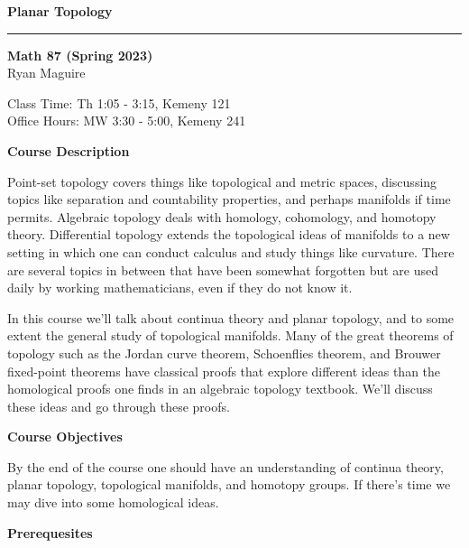 \documentclass{article}
\begin{document}
    \LARGE
    \textbf{Planar Topology}
    \hrule\par\hfill\par
    \normalsize
    \textbf{Math 87 (Spring 2023)}\\
    Ryan Maguire\\
    \color{gray}{Ryan.J.Maguire.GR@dartmouth.edu}
    \par\vspace{0.5cm}
    \color{black}
    Class Time: Th 1:05 - 3:15, Kemeny 121\\
    Office Hours: MW 3:30 - 5:00, Kemeny 241\\
    \par\vspace{0.5cm}
    \textbf{Course Description}
    \par\hfill\par
    Point-set topology covers things like topological and metric spaces,
    discussing topics like separation and countability properties, and perhaps
    manifolds if time permits. Algebraic topology deals with homology,
    cohomology, and homotopy theory. Differential topology extends the
    topological ideas of manifolds to a new setting in which one can conduct
    calculus and study things like curvature. There are several topics in
    between that have been somewhat forgotten but are used daily by working
    mathematicians, even if they do not know it.
    \par\hfill\par
    In this course we’ll talk about continua theory and planar topology, and to
    some extent the general study of topological manifolds. Many of the great
    theorems of topology such as the Jordan curve theorem, Schoenflies theorem,
    and Brouwer fixed-point theorems have classical proofs that explore
    different ideas than the homological proofs one finds in an algebraic
    topology textbook. We’ll discuss these ideas and go through these proofs.
    \par\hfill\par
    \textbf{Course Objectives}
    \par\hfill\par
    By the end of the course one should have an understanding of continua
    theory, planar topology, topological manifolds, and homotopy groups. If
    there’s time we may dive into some homological ideas.
    \par\hfill\par
    \textbf{Prerequesites}
    \par\hfill\par
\end{document}
